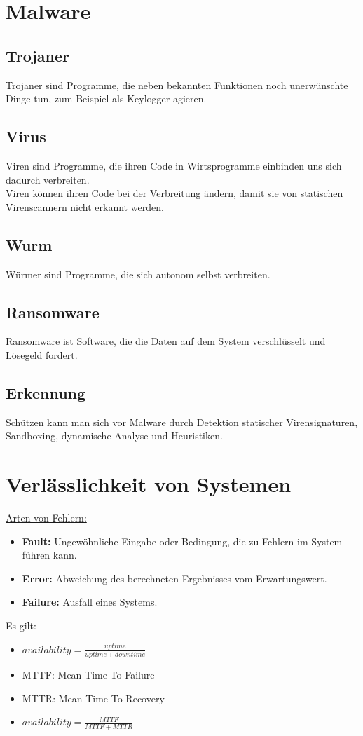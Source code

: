 \section{Malware}

\subsection{Trojaner}
Trojaner sind Programme, die neben bekannten Funktionen noch unerwünschte Dinge tun, zum Beispiel als Keylogger agieren.

\subsection{Virus}
Viren sind Programme, die ihren Code in Wirtsprogramme einbinden uns sich dadurch verbreiten.\\Viren können ihren Code bei der Verbreitung ändern, damit sie von statischen Virenscannern nicht erkannt werden.

\subsection{Wurm}
Würmer sind Programme, die sich autonom selbst verbreiten.

\subsection{Ransomware}
Ransomware ist Software, die die Daten auf dem System verschlüsselt und Lösegeld fordert.

\subsection{Erkennung}
Schützen kann man sich vor Malware durch Detektion statischer Virensignaturen, Sandboxing, dynamische Analyse und Heuristiken.

\section{Verlässlichkeit von Systemen}
\underline{Arten von Fehlern:}
\begin{itemize}
	\item \textbf{Fault:} Ungewöhnliche Eingabe oder Bedingung, die zu Fehlern im System führen kann.
	\item \textbf{Error:} Abweichung des berechneten Ergebnisses vom Erwartungswert.
	\item \textbf{Failure:} Ausfall eines Systems.
\end{itemize}
Es gilt:
\begin{itemize}
	\item $availability = \frac{uptime}{uptime+downtime}$
	\item MTTF: Mean Time To Failure
	\item MTTR: Mean Time To Recovery
	\item $availability = \frac{MTTF}{MTTF+MTTR}$
\end{itemize}

